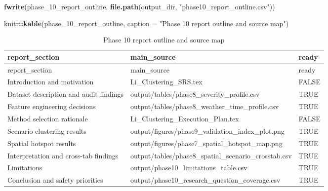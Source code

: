 \documentclass[
]{article}
\newenvironment{Shaded}{\begin{snugshade}}{\end{snugshade}}
\newcommand{\AttributeTok}[1]{\textcolor[rgb]{0.13,0.29,0.53}{#1}}
\newcommand{\FunctionTok}[1]{\textcolor[rgb]{0.13,0.29,0.53}{\textbf{#1}}}
\newcommand{\NormalTok}[1]{#1}
\newcommand{\SpecialCharTok}[1]{\textcolor[rgb]{0.81,0.36,0.00}{\textbf{#1}}}
\newcommand{\StringTok}[1]{\textcolor[rgb]{0.31,0.60,0.02}{#1}}
\begin{document}
\begin{Shaded}
\begin{Highlighting}[]
\FunctionTok{fwrite}\NormalTok{(phase\_10\_report\_outline, }\FunctionTok{file.path}\NormalTok{(output\_dir, }\StringTok{"phase10\_report\_outline.csv"}\NormalTok{))}

\NormalTok{knitr}\SpecialCharTok{::}\FunctionTok{kable}\NormalTok{(phase\_10\_report\_outline, }\AttributeTok{caption =} \StringTok{"Phase 10 report outline and source map"}\NormalTok{)}
\end{Highlighting}
\end{Shaded}

\begin{longtable}[]{@{}
  >{\raggedright\arraybackslash}p{}
  >{\raggedright\arraybackslash}p{}
  >{\raggedright\arraybackslash}p{}@{}}
\caption{Phase 10 report outline and source map}\tabularnewline
\toprule\noalign{}
\begin{minipage}[b]{\linewidth}\raggedright
report\_section
\end{minipage} & \begin{minipage}[b]{\linewidth}\raggedright
main\_source
\end{minipage} & \begin{minipage}[b]{\linewidth}\raggedright
ready
\end{minipage} \\
\midrule\noalign{}
\endfirsthead
\toprule\noalign{}
\begin{minipage}[b]{\linewidth}\raggedright
report\_section
\end{minipage} & \begin{minipage}[b]{\linewidth}\raggedright
main\_source
\end{minipage} & \begin{minipage}[b]{\linewidth}\raggedright
ready
\end{minipage} \\
\midrule\noalign{}
\endhead
\bottomrule\noalign{}
\endlastfoot
Introduction and motivation & Li\_Clustering\_SRS.tex & FALSE \\
Dataset description and audit findings &
output/tables/phase8\_severity\_profile.csv & TRUE \\
Feature engineering decisions &
output/tables/phase8\_weather\_time\_profile.csv & TRUE \\
Method selection rationale & Li\_Clustering\_Execution\_Plan.tex &
FALSE \\
Scenario clustering results &
output/figures/phase9\_validation\_index\_plot.png & TRUE \\
Spatial hotspot results &
output/figures/phase7\_spatial\_hotspot\_map.png & TRUE \\
Interpretation and cross-tab findings &
output/tables/phase8\_spatial\_scenario\_crosstab.csv & TRUE \\
Limitations & output/phase10\_limitations\_table.csv & TRUE \\
Conclusion and safety priorities &
output/phase10\_research\_question\_coverage.csv & TRUE \\
\end{longtable}
\end{document}
